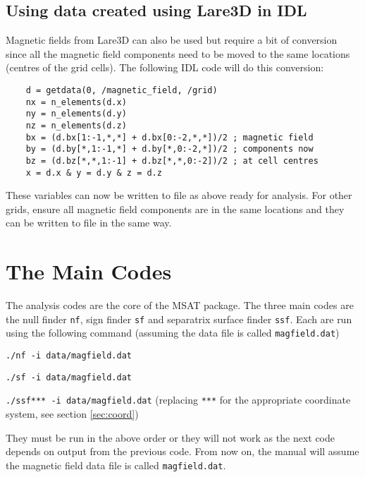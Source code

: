 \documentclass[12pt]{article}
\begin{document}
    \subsection{Using data created using Lare3D in IDL}

      Magnetic fields from Lare3D can also be used but require a bit of conversion since all the magnetic field components need to be moved to the same locations (centres of the grid cells). The following IDL code will do this conversion:

      \begin{verbatim}
    d = getdata(0, /magnetic_field, /grid)
    nx = n_elements(d.x)
    ny = n_elements(d.y)
    nz = n_elements(d.z)
    bx = (d.bx[1:-1,*,*] + d.bx[0:-2,*,*])/2 ; magnetic field
    by = (d.by[*,1:-1,*] + d.by[*,0:-2,*])/2 ; components now
    bz = (d.bz[*,*,1:-1] + d.bz[*,*,0:-2])/2 ; at cell centres
    x = d.x & y = d.y & z = d.z
      \end{verbatim}

      These variables can now be written to file as above ready for analysis. For other grids, ensure all magnetic field components are in the same locations and they can be written to file in the same way.

  \section{The Main Codes}

    The analysis codes are the core of the MSAT package. The three main codes are the null finder \texttt{nf}, sign finder \texttt{sf} and separatrix surface finder \texttt{ssf}. Each are run using the following command (assuming the data file is called \texttt{magfield.dat})

    \texttt{./nf -i data/magfield.dat}

    \texttt{./sf -i data/magfield.dat}
    
    \texttt{./ssf*** -i data/magfield.dat} (replacing \texttt{***} for the appropriate coordinate system, see section \ref{sec:coord})

    They must be run in the above order or they will not work as the next code depends on output from the previous code. From now on, the manual will assume the magnetic field data file is called \texttt{magfield.dat}.
\end{document}
